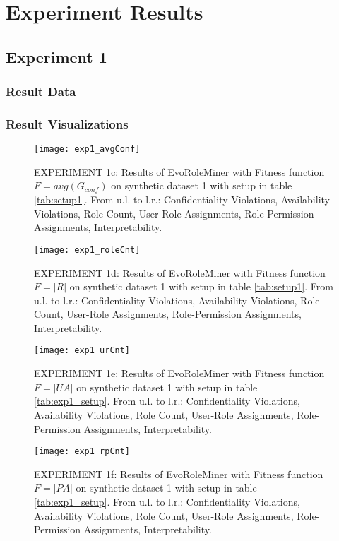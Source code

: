 \chapter{Experiment Results}
\section{Experiment 1}
\label{sec:A_Exp1}
	\subsection{Result Data}
	\label{sec:A_Exp1_Data}
	\subsection{Result Visualizations}
	\label{sec:A_Exp1_Diagrams}
		\begin{figure}[H]
			\centering
		    \texttt{[image: exp1\_avgConf]}
		    \caption{EXPERIMENT 1c: Results of EvoRoleMiner with Fitness function $F=avg(G_{conf})$ on synthetic dataset 1 with setup in table \ref{tab:setup1}. From u.l. to l.r.: Confidentiality Violations, Availability Violations, Role Count, User-Role Assignments, Role-Permission Assignments, Interpretability.}
		    \label{fig:exp1_avgConf}
		\end{figure}
		
		\begin{figure}[H]
			\centering
		    \texttt{[image: exp1\_roleCnt]}
		    \caption{EXPERIMENT 1d: Results of EvoRoleMiner with Fitness function $F=|R|$ on synthetic dataset 1 with setup in table \ref{tab:setup1}. From u.l. to l.r.: Confidentiality Violations, Availability Violations, Role Count, User-Role Assignments, Role-Permission Assignments, Interpretability.}
		    \label{fig:exp1_roleCnt}
		\end{figure}
		
		\begin{figure}[H]
			\centering
		    \texttt{[image: exp1\_urCnt]}
		    \caption{EXPERIMENT 1e: Results of EvoRoleMiner with Fitness function $F=|UA|$ on synthetic dataset 1 with setup in table \ref{tab:exp1_setup}. From u.l. to l.r.: Confidentiality Violations, Availability Violations, Role Count, User-Role Assignments, Role-Permission Assignments, Interpretability.}
		    \label{fig:exp1_urCnt}
		\end{figure}
		
		\begin{figure}[H]
		    \centering
		    \texttt{[image: exp1\_rpCnt]}
	    	\caption{EXPERIMENT 1f: Results of EvoRoleMiner with Fitness function $F=|PA|$ on synthetic dataset 1 with setup in table \ref{tab:exp1_setup}. From u.l. to l.r.: Confidentiality Violations, Availability Violations, Role Count, User-Role Assignments, Role-Permission Assignments, Interpretability.}
	    	\label{fig:exp1_rpCnt}
	    \end{figure}
	
